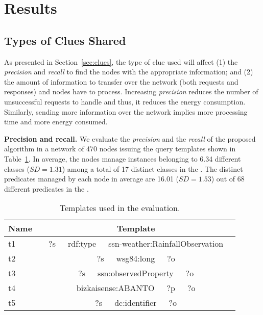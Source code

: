 \section{Results}
\label{results}

\subsection{Types of Clues Shared}
\label{sec:clues_eval}
As presented in Section~\ref{sec:clues}, the type of clue used will affect
(1) the \emph{precision} and \emph{recall} to find the nodes with the appropriate information; %
and (2) the amount of information to transfer over the network (both requests and responses) and nodes have to process.
Increasing \emph{precision} reduces the number of unsuccessful requests to handle and thus, it reduces the energy consumption. 
Similarly, sending more information over the network implies more processing time and more energy consumed.

\medskip

\noindent\textbf{Precision and recall.}
We evaluate the \emph{precision} and the \emph{recall} of the proposed algorithm in a network of 470 nodes issuing the query templates shown in Table~\ref{tab:evaluationTemplates}.
In average, the nodes manage instances belonging to 6.34 different classes ($SD=1.31$) among a total of 17 distinct classes in the \Space{}.
The distinct predicates managed by each node in average are 16.01 ($SD=1.53$) out of 68 different predicates in the \Space{}.

\begin{table}[h!tbp]
  \centering
  \begin{tabular}{ l c }
    \hline
    Name & Template \\
    \hline
    t1 & ~~?s~~~rdf:type~~~ssn-weather:RainfallObservation~~ \\
    t2 & ~~?s~~~wsg84:long~~~?o~~ \\
    t3 & ~~?s~~~ssn:observedProperty~~~?o~~ \\
    t4 & ~~bizkaisense:ABANTO~~~?p~~~?o~~ \\
    t5 & ~~?s~~~dc:identifier~~~?o~~ \\
    \hline
  \end{tabular}
  \caption{Templates used in the evaluation.}
  \label{tab:evaluationTemplates}
\end{table}

